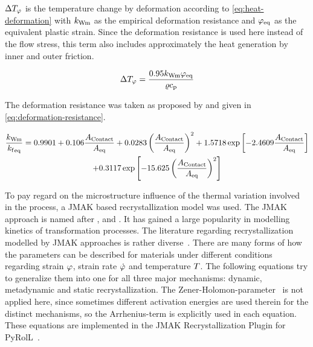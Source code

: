 \noindent$\Delta{T}_{{\varphi}}$ is the temperature change by deformation according to \autoref{eq:heat-deformation} with ${k_\mathrm{Wm}}$ as the empirical deformation resistance and ${{{\varphi}}_\mathrm{eq}}$ as the equivalent plastic strain.
Since the deformation resistance is used here instead of the flow stress, this term also includes approximately the heat generation by inner and outer friction.

\begin{equation}
    \Delta{T}_{{\varphi}} = \frac{\num{0.95} {k_\mathrm{Wm}} {{{\varphi}}_\mathrm{eq}}}{{\varrho}{c_\mathrm{p}}}
    \label{eq:heat-deformation}
\end{equation}

The deformation resistance was taken as proposed by \textcite{Hensel1978} and given in \autoref{eq:deformation-resistance}.

\begin{multline}
    \frac{{k_\mathrm{Wm}}}{{{{k_\mathrm{f}}}_\mathrm{eq}}} = \num{0.9901} + \num{0.106} \frac{{{A}_\mathrm{Contact}}}{{{{A}}_\mathrm{eq}}} + \num{0.0283} \left( \frac{{{A}_\mathrm{Contact}}}{{{{A}}_\mathrm{eq}}} \right)^2 + \num{1.5718} \exp \left[ \num{-2.4609} \frac{{{A}_\mathrm{Contact}}}{{{{A}}_\mathrm{eq}}} \right] \\
    + \num{0.3117} \exp \left[ \num{-15.625} \left( \frac{{{A}_\mathrm{Contact}}}{{{{A}}_\mathrm{eq}}} \right)^2 \right]
    \label{eq:deformation-resistance}
\end{multline}

To pay regard on the microstructure influence of the thermal variation involved in the process, a JMAK based recrystallization model was used.
The JMAK approach is named after \textcite{Johnson1939}, \textcite{Avrami1939, Avrami1940, Avrami1941} and \textcite{Kolmogorov1937}.
It has gained a large popularity in modelling kinetics of transformation processes.
The literature regarding recrystallization modelled by JMAK approaches is rather diverse~\cite{Luton1969, Sellars1978, Sellars1979, Sellars1985, Beynon1992, Glover1972, Glover1973, Hodgson1992, Laasraoui1991, Laasraoui1991a, Hernandez1996, Medina1996, Fernandez2000, Fernandez2003, Karhausen1992,Roberts1979, Maccagno1996, Siciliano2000}.
There are many forms of how the parameters can be described for materials under different conditions regarding strain ${\varphi}$, strain rate ${\dot{\varphi}}$ and temperature ${T}$.
The following equations try to generalize them into one for all three major mechanisms: dynamic, metadynamic and static recrystallization.
The Zener-Holomon-parameter~\cite{Zener1944} is not applied here, since sometimes different activation energies are used therein for the distinct mechanisms, so the Arrhenius-term is explicitly used in each equation.
These equations are implemented in the JMAK Recrystallization Plugin for PyRolL~\cite{pyroll-jmak-recrystallization}.

